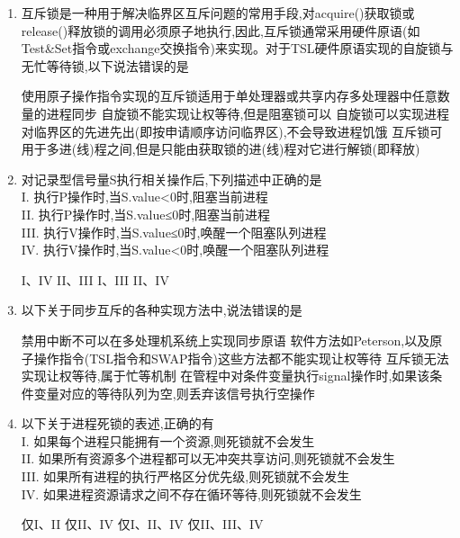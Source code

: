 \documentclass[12pt, a4paper, oneside, UTF8]{ctexbook}
\begin{document}
\begin{enumerate}
    \item 互斥锁是一种用于解决临界区互斥问题的常用手段,对acquire()获取锁或release()释放锁的调用必须原子地执行,因此,互斥锁通常采用硬件原语(如Test\&Set指令或exchange交换指令)来实现。对于TSL硬件原语实现的自旋锁与无忙等待锁,以下说法错误的是
    \begin{choices}[1]
    \task 使用原子操作指令实现的互斥锁适用于单处理器或共享内存多处理器中任意数量的进程同步
    \task 自旋锁不能实现让权等待,但是阻塞锁可以
    \task 自旋锁可以实现进程对临界区的先进先出(即按申请顺序访问临界区),不会导致进程饥饿
    \task 互斥锁可用于多进(线)程之间,但是只能由获取锁的进(线)程对它进行解锁(即释放)
    \end{choices}

    \item 对记录型信号量S执行相关操作后,下列描述中正确的是\\
    I. 执行P操作时,当S.value<0时,阻塞当前进程\\
    II. 执行P操作时,当S.value≤0时,阻塞当前进程\\
    III. 执行V操作时,当S.value≤0时,唤醒一个阻塞队列进程\\
    IV. 执行V操作时,当S.value<0时,唤醒一个阻塞队列进程
    \begin{choices}[2]
    \task I、IV
    \task II、III
    \task I、III
    \task II、IV
    \end{choices}

    \item 以下关于同步互斥的各种实现方法中,说法错误的是
    \begin{choices}[1]
    \task 禁用中断不可以在多处理机系统上实现同步原语
    \task 软件方法如Peterson,以及原子操作指令(TSL指令和SWAP指令)这些方法都不能实现让权等待
    \task 互斥锁无法实现让权等待,属于忙等机制
    \task 在管程中对条件变量执行signal操作时,如果该条件变量对应的等待队列为空,则丢弃该信号执行空操作
    \end{choices}

    \item 以下关于进程死锁的表述,正确的有\\
    I. 如果每个进程只能拥有一个资源,则死锁就不会发生\\
    II. 如果所有资源多个进程都可以无冲突共享访问,则死锁就不会发生\\
    III. 如果所有进程的执行严格区分优先级,则死锁就不会发生\\
    IV. 如果进程资源请求之间不存在循环等待,则死锁就不会发生
    \begin{choices}[2]
    \task 仅I、II
    \task 仅II、IV
    \task 仅I、II、IV
    \task 仅II、III、IV
    \end{choices}


\end{enumerate}
\end{document}

